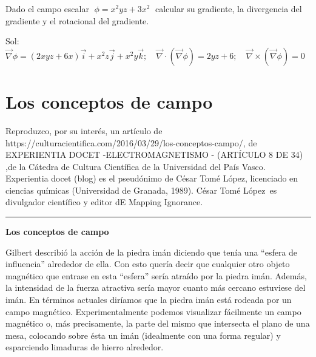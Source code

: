 \vspace{3mm}
\begin{mipropuesto}

Dado el campo escalar $\; \phi=x^2yz+3x^2\; $ calcular su gradiente, la divergencia del gradiente y el rotacional del gradiente.

\end{mipropuesto}

\textcolor{gris}{Sol: $\overrightarrow \nabla \phi= (2xyz+6x)\vec i+x^2z\vec j+x^2y\vec k; \quad \overrightarrow \nabla \cdot(\overrightarrow \nabla \phi) = 2yz+6 ; \quad \overrightarrow \nabla \times (\overrightarrow \nabla \phi) =0$}

\section{Los conceptos de campo}

\begin{scriptsize}

\textcolor{gris}{ Reproduzco, por su interés, un artículo de }
\textcolor{gris}{https://culturacientifica.com/2016/03/29/los-conceptos-campo/, de EXPERIENTIA DOCET -ELECTROMAGNETISMO - (ARTÍCULO 8 DE 34) ,de la Cátedra de Cultura Científica de la Universidad del País Vasco.}
\textcolor{gris}{ Experientia docet (blog) es el pseudónimo de César Tomé López,  licenciado en ciencias químicas (Universidad de Granada, 1989). César Tomé López es divulgador científico y editor dE Mapping Ignorance.}
\end{scriptsize}
\vspace{4mm}

\color{ForestGreen!80}
\rule{250pt}{0.2pt}

\textbf{Los conceptos de campo}

Gilbert describió la acción de la piedra imán diciendo que tenía una “esfera de influencia” alrededor de ella. Con esto quería decir que cualquier otro objeto magnético que entrase en esta “esfera” sería atraído por la piedra imán. Además, la intensidad de la fuerza atractiva sería mayor cuanto más cercano estuviese del imán. En términos actuales diríamos que la piedra imán está rodeada por un campo magnético. Experimentalmente podemos visualizar fácilmente un campo magnético o, más precisamente, la parte del mismo que intersecta el plano de una mesa, colocando sobre ésta un imán (idealmente con una forma regular) y esparciendo limaduras de hierro alrededor.


